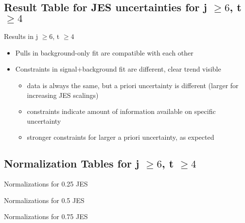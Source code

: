 \subsection{Result Table for JES uncertainties for j $\geq 6$, t $\geq 4$}
\begin{frame}{Results in j $\geq 6$, t $\geq 4$}

\begin{itemize}
\item Pulls in background-only fit are compatible with each other
\item Constraints in signal+background fit are different, clear trend visible\\
\begin{itemize}
\item data is always the same, but a priori uncertainty is different (larger for increasing JES scalings)\\
\item constraints indicate amount of information available on specific uncertainty\\
\item stronger constraints for larger a priori uncertainty, as expected
\end{itemize}
\end{itemize}
\end{frame}

\subsection{Normalization Tables for j $\geq 6$, t $\geq 4$}

\begin{frame}{Normalizations for \num{0.25} JES}
\begin{scriptsize}

\end{scriptsize}
\end{frame}

\begin{frame}{Normalizations for \num{0.5} JES}
\begin{scriptsize}

\end{scriptsize}
\end{frame}

\begin{frame}{Normalizations for \num{0.75} JES}
\begin{scriptsize}

\end{scriptsize}
\end{frame}

